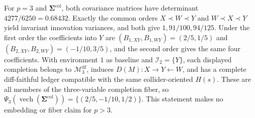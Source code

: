 For \(p=3\) and \(\boldsymbol\Sigma^{\mathrm{col}}\), both covariance matrices have determinant \(4277/6250=0.68432\). Exactly the common orders \(X\prec W\prec Y\) and \(W\prec X\prec Y\) yield invariant innovation variances, and both give \(1,91/100,94/125\). Under the first order the coefficients into \(Y\) are \((B_{1,XY},B_{1,WY})=(2/5,1/5)\) and \((B_{2,XY},B_{2,WY})=(-1/10,3/5)\), and the second order gives the same four coefficients. With environment \(1\) as baseline and \(\mathcal I_2=\{Y\}\), each displayed completion belongs to \(\mathcal M_3^{\mathrm{df}}\), induces \(D(M):X\to Y\leftarrow W\), and has a complete diff-faithful ledger compatible with the same collider-oriented \(H(s)\). These are all members of the three-variable completion fiber, so \(\Psi_3(\operatorname{vech}(\boldsymbol\Sigma^{\mathrm{col}}))=\{(2/5,-1/10,1/2)\}\). This statement makes no embedding or fiber claim for \(p>3\).